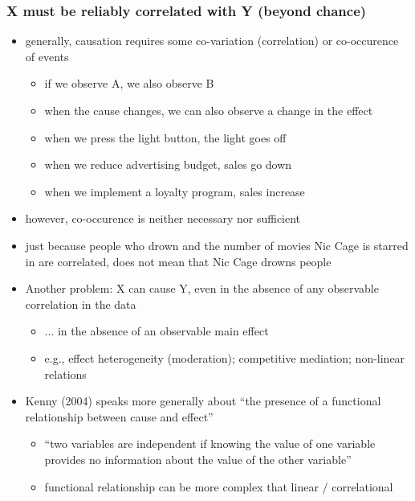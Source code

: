 \documentclass[10pt]{article}
\begin{document}
\subsubsection{X must be reliably correlated with Y (beyond chance)}
\begin{itemize}
    \item generally, causation requires some co-variation (correlation) or co-occurence of events
    \begin{itemize}
        \item if we observe A, we also observe B
        \item when the cause changes, we can also observe a change in the effect 
        \item when we press the light button, the light goes off 
        \item when we reduce advertising budget, sales go down 
        \item when we implement a loyalty program, sales increase 
    \end{itemize}
    \item however, co-occurence is neither necessary nor sufficient 
    \item just because people who drown and the number of movies Nic Cage is starred in are correlated, does not mean that Nic Cage drowns people
    \item Another problem: X can cause Y, even in the absence of any observable correlation in the data 
    \begin{itemize}
        \item ... in the absence of an observable main effect
        \item e.g., effect heterogeneity (moderation); competitive mediation; non-linear relations
    \end{itemize}
    \item Kenny (2004) speaks more generally about ``the presence of a functional relationship between cause and effect''
    \begin{itemize}
        \item ``two variables are independent if knowing the value of one variable provides no information about the value of the other variable''
        \item functional relationship can be more complex that linear / correlational
    \end{itemize}
\end{itemize}
\end{document}
